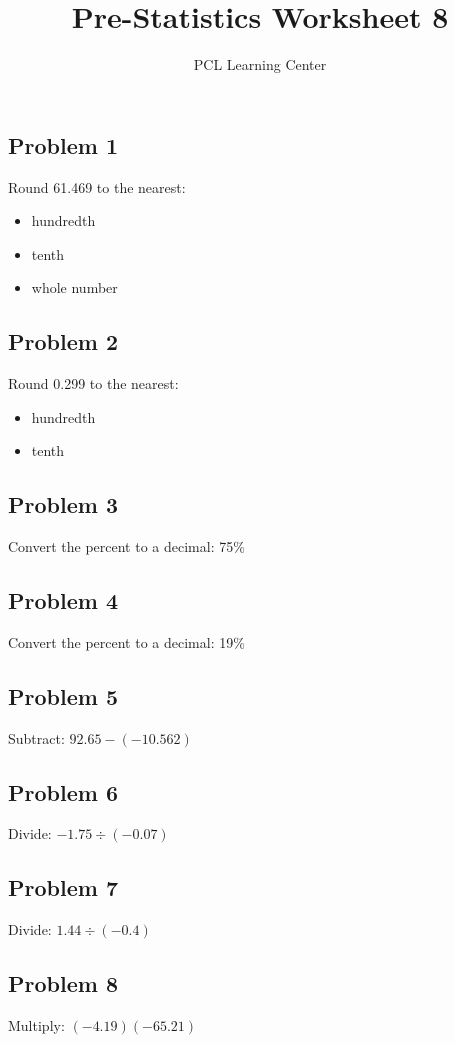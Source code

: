 \documentclass[12pt]{article}
\title{Pre-Statistics Worksheet 8}
\author{PCL Learning Center}
\date{}
\begin{document}
\maketitle

\subsection*{Problem 1}
Round 61.469 to the nearest:
\begin{itemize}
    \item hundredth
    \item tenth
    \item whole number
\end{itemize}

\subsection*{Problem 2}
Round 0.299 to the nearest:
\begin{itemize}
    \item hundredth
    \item tenth
\end{itemize}

\subsection*{Problem 3}
Convert the percent to a decimal: 75\%

\subsection*{Problem 4}
Convert the percent to a decimal: 19\%

\subsection*{Problem 5}
Subtract: \(92.65 - (-10.562)\)

\subsection*{Problem 6}
Divide: \(-1.75 \div (-0.07)\)

\subsection*{Problem 7}
Divide: \(1.44 \div (-0.4)\)

\subsection*{Problem 8}
Multiply: \((-4.19)(-65.21)\)
\end{document}
